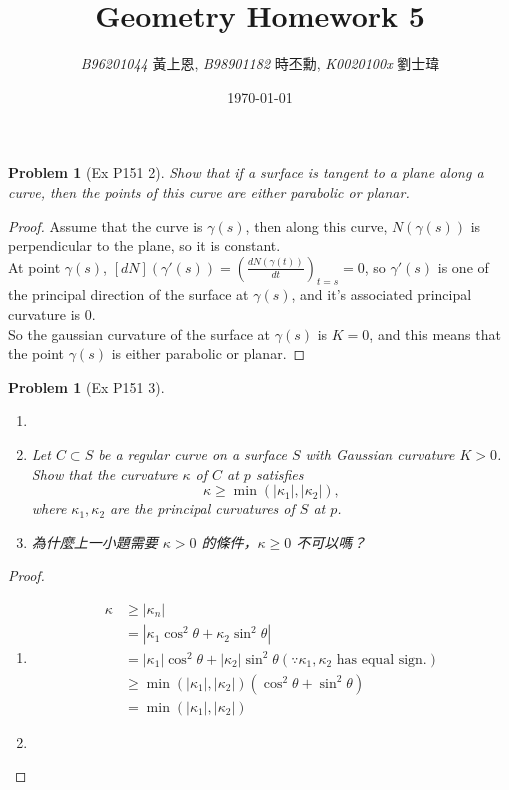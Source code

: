 \documentclass[10pt,a4paper]{article}
\newcommand{\LiHei}{\CJKfamily{lh}}
\newcounter{theProblemCounter}
\newtheorem{problem}[theProblemCounter]{Problem}
\begin{document}
\title{{Geometry Homework 5}}
\author{{\it{B96201044}} {\LiHei 黃上恩}, {\it{B98901182}} {\LiHei 時丕勳}, {\it{K0020100x}} {\LiHei 劉士瑋}}
\date{\today}
\maketitle

\newcommand{\bx}{\mathbb{X}}
\setcounter{theProblemCounter}{0}
\begin{problem}[Ex P151 2]
Show that if a surface is tangent to a plane along a curve, then the points of this curve are either parabolic or planar.
\end{problem}
\begin{proof}
Assume that the curve is $\gamma(s)$, then along this curve, $N(\gamma(s))$ is perpendicular to the plane, so it is constant.\\
At point $\gamma(s)$, $[dN](\gamma'(s))=\left(\frac{d N(\gamma(t))}{dt}\right)_{t=s}=0$, so $\gamma'(s)$ is one of the principal direction of the surface at $\gamma(s)$, and it's associated principal curvature is $0$.\\
So the gaussian curvature of the surface at $\gamma(s)$ is $K=0$, and this means that the point $\gamma(s)$ is either parabolic or planar.
\end{proof}

\setcounter{theProblemCounter}{2}
\begin{problem}[Ex P151 3]
\begin{enumerate}
\item[]
\item[(a)] Let $C\subset S$ be a regular curve on a surface $S$ with Gaussian curvature $K > 0$. Show that the curvature $\kappa$ of $C$ at $p$ satisfies \[ \kappa\ge \min(|\kappa_1|, |\kappa_2|),\] where $\kappa_1, \kappa_2$ are the principal curvatures of $S$ at $p$.
\item[(b)] 為什麼上一小題需要 $\kappa>0$ 的條件，$\kappa\ge 0$ 不可以嗎？ %
\end{enumerate}
\end{problem}
\begin{proof}
\begin{enumerate}
\item[(a)]
\begin{align*}
\kappa&\ge |\kappa_n|\\
&=|\kappa_1\cos^2\theta+\kappa_2\sin^2\theta|\\
&=|\kappa_1|\cos^2\theta+|\kappa_2|\sin^2\theta (\because\kappa_1, \kappa_2\textrm{ has equal sign.})\\
&\ge \min(|\kappa_1|, |\kappa_2|)(\cos^2\theta+\sin^2\theta)\\
&=\min(|\kappa_1|, |\kappa_2|)
\end{align*}
\item[(b)]
\end{enumerate}
\end{proof}
\end{document}
